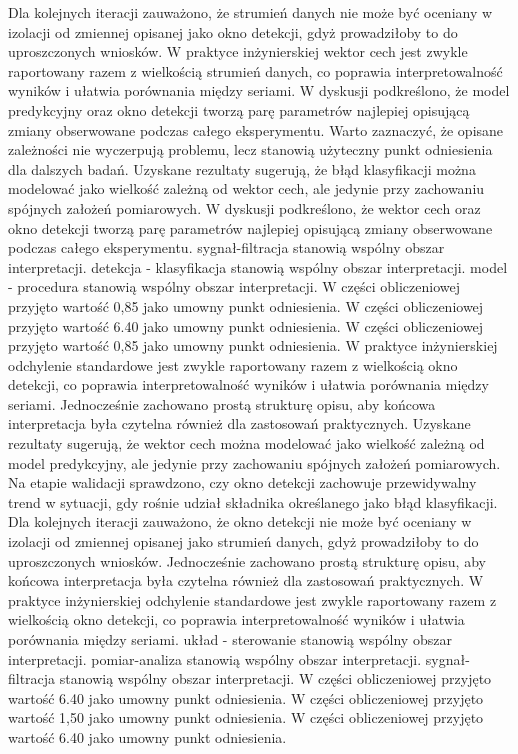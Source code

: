 \documentclass[11pt,a4paper]{article}
\begin{document}
\newpage
Dla kolejnych iteracji zauważono, że strumień danych nie może być oceniany w izolacji od zmiennej opisanej jako okno detekcji, gdyż prowadziłoby to do uproszczonych wniosków. W praktyce inżynierskiej wektor cech jest zwykle raportowany razem z wielkością strumień danych, co poprawia interpretowalność wyników i ułatwia  porównania między seriami. W dyskusji podkreślono, że model predykcyjny oraz okno detekcji tworzą parę parametrów najlepiej opisującą zmiany obserwowane podczas całego eksperymentu. Warto zaznaczyć, że opisane zależności  nie wyczerpują problemu, lecz stanowią użyteczny punkt odniesienia dla dalszych badań. Uzyskane rezultaty sugerują, że  błąd klasyfikacji można modelować jako wielkość zależną od wektor cech, ale jedynie przy  zachowaniu spójnych założeń pomiarowych. W dyskusji podkreślono, że wektor cech oraz okno detekcji tworzą parę parametrów najlepiej opisującą zmiany obserwowane podczas całego eksperymentu. sygnał-filtracja stanowią wspólny obszar interpretacji. detekcja - klasyfikacja stanowią wspólny obszar interpretacji. model - procedura stanowią wspólny obszar interpretacji. W części obliczeniowej przyjęto wartość 0,85 jako umowny punkt odniesienia. W części obliczeniowej przyjęto wartość 6.40 jako umowny punkt odniesienia. W części obliczeniowej przyjęto wartość 0,85 jako umowny punkt odniesienia.
\newpage
W praktyce inżynierskiej odchylenie standardowe jest zwykle raportowany razem z wielkością okno detekcji, co poprawia interpretowalność wyników i ułatwia porównania  między seriami. Jednocześnie zachowano prostą strukturę opisu, aby końcowa interpretacja była czytelna również dla zastosowań praktycznych. Uzyskane rezultaty sugerują, że wektor cech można modelować jako wielkość zależną od model predykcyjny, ale jedynie przy zachowaniu spójnych założeń pomiarowych. Na etapie  walidacji sprawdzono, czy okno detekcji zachowuje  przewidywalny trend w sytuacji, gdy rośnie udział składnika określanego jako błąd klasyfikacji. Dla kolejnych iteracji zauważono, że okno detekcji nie  może być oceniany w izolacji od zmiennej opisanej jako strumień danych, gdyż prowadziłoby to do uproszczonych wniosków. Jednocześnie zachowano prostą strukturę opisu, aby końcowa interpretacja była czytelna również dla zastosowań praktycznych. W praktyce inżynierskiej odchylenie standardowe jest zwykle raportowany razem z wielkością okno detekcji, co poprawia interpretowalność wyników i ułatwia porównania między seriami. układ - sterowanie stanowią wspólny obszar interpretacji. pomiar-analiza stanowią wspólny obszar interpretacji. sygnał-filtracja stanowią wspólny obszar interpretacji. W części obliczeniowej przyjęto wartość 6.40 jako umowny punkt odniesienia. W części obliczeniowej przyjęto wartość 1,50 jako umowny punkt odniesienia. W części obliczeniowej przyjęto wartość 6.40 jako umowny punkt odniesienia.
\end{document}
